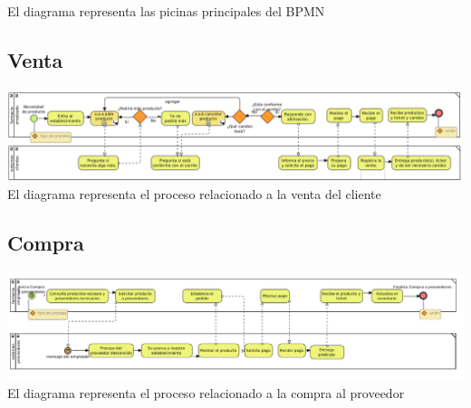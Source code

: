 \begin{flushleft}
\begin{center}
	\normalsize{El diagrama representa las picinas principales del BPMN}
	\end{center}
		

	\subsection{Venta}
	 
	\begin{center}
	
	\includegraphics[width=14cm]{proceso/images/a.a.venta.png}\\	
	
	\normalsize{El diagrama representa el proceso relacionado a la venta del cliente}
	\end{center}
		

	\subsection{Compra}
	 
	\begin{center}
	
	\includegraphics[width=14cm]{proceso/images/a.b.compra.png}\\	
	
	\normalsize{El diagrama representa el proceso relacionado a la compra al proveedor}
	\end{center}
		

\end{flushleft}
